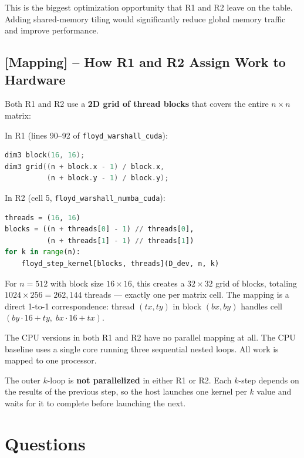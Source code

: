 \documentclass[11pt]{article}
\begin{document}
This is the biggest optimization opportunity that R1 and R2 leave on the table. Adding shared-memory tiling would significantly reduce global memory traffic and improve performance.

\subsection*{[Mapping] -- How R1 and R2 Assign Work to Hardware}

Both R1 and R2 use a \textbf{2D grid of thread blocks} that covers the entire $n \times n$ matrix:

In R1 (lines 90--92 of \texttt{floyd\_warshall\_cuda}):
\begin{lstlisting}[language=C++]
dim3 block(16, 16);
dim3 grid((n + block.x - 1) / block.x,
          (n + block.y - 1) / block.y);
\end{lstlisting}

In R2 (cell 5, \texttt{floyd\_warshall\_numba\_cuda}):
\begin{lstlisting}[language=Python]
threads = (16, 16)
blocks = ((n + threads[0] - 1) // threads[0],
          (n + threads[1] - 1) // threads[1])
for k in range(n):
    floyd_step_kernel[blocks, threads](D_dev, n, k)
\end{lstlisting}

For $n = 512$ with block size $16 \times 16$, this creates a $32 \times 32$ grid of blocks, totaling $1024 \times 256 = 262{,}144$ threads --- exactly one per matrix cell. The mapping is a direct 1-to-1 correspondence: thread $(tx, ty)$ in block $(bx, by)$ handles cell $(by \cdot 16 + ty,\; bx \cdot 16 + tx)$.

The CPU versions in both R1 and R2 have no parallel mapping at all. The CPU baseline uses a single core running three sequential nested loops. All work is mapped to one processor.

The outer $k$-loop is \textbf{not parallelized} in either R1 or R2. Each $k$-step depends on the results of the previous step, so the host launches one kernel per $k$ value and waits for it to complete before launching the next.

\section{Questions}
\end{document}

